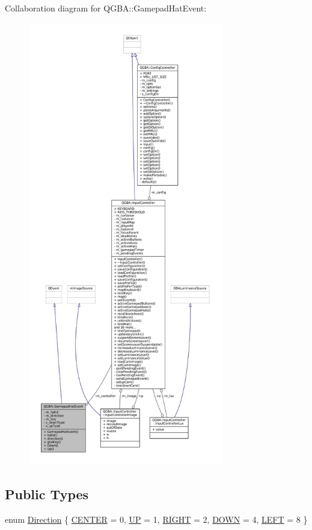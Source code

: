Collaboration diagram for Q\+G\+BA\+:\+:Gamepad\+Hat\+Event\+:
\nopagebreak
\begin{figure}[H]
\begin{center}
\leavevmode
\includegraphics[height=550pt]{class_q_g_b_a_1_1_gamepad_hat_event__coll__graph}
\end{center}
\end{figure}
\subsection*{Public Types}
\begin{DoxyCompactItemize}
\item 
enum \mbox{\hyperlink{class_q_g_b_a_1_1_gamepad_hat_event_ae3f20662c61b054e5344aafb9d843837}{Direction}} \{ \newline
\mbox{\hyperlink{class_q_g_b_a_1_1_gamepad_hat_event_ae3f20662c61b054e5344aafb9d843837af37fc69d62bd1fb2392313ce300829e6}{C\+E\+N\+T\+ER}} = 0, 
\mbox{\hyperlink{class_q_g_b_a_1_1_gamepad_hat_event_ae3f20662c61b054e5344aafb9d843837a634fcdd89d76d58a391f55c576b7ac66}{UP}} = 1, 
\mbox{\hyperlink{class_q_g_b_a_1_1_gamepad_hat_event_ae3f20662c61b054e5344aafb9d843837a06aa9cf5eb0ca3c03890a94a5519d7ff}{R\+I\+G\+HT}} = 2, 
\mbox{\hyperlink{class_q_g_b_a_1_1_gamepad_hat_event_ae3f20662c61b054e5344aafb9d843837a4c5484e4d90fd21a0951faecaf778009}{D\+O\+WN}} = 4, 
\newline
\mbox{\hyperlink{class_q_g_b_a_1_1_gamepad_hat_event_ae3f20662c61b054e5344aafb9d843837a66d96381e5ff366cdb9ff9dd311d0f93}{L\+E\+FT}} = 8
 \}
\end{DoxyCompactItemize}
